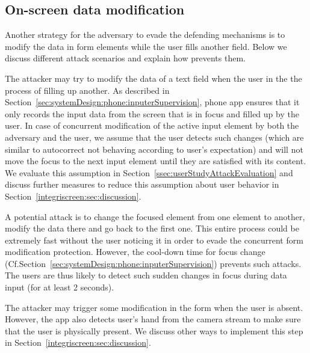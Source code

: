 \subsection{On-screen data modification}
Another strategy for the adversary to evade the defending mechanisms is to modify the data in form elements while the user fills another field. Below we discuss different attack scenarios and explain how \sysname prevents them.


 The attacker may try to modify the data of a text field when the user in the the process of filling up another. As described in Section~\ref{sec:systemDesign:phone:inputerSupervision}, \sysname phone app ensures that it only records the input data from the screen that is in focus and filled up by the user. In case of concurrent modification of the active input element by both the adversary and the user, we assume that the user detects such changes (which are similar to autocorrect not behaving according to user's expectation) and will not move the focus to the next input element until they are satisfied with its content.
We evaluate this assumption in Section~\ref{ssec:userStudyAttackEvaluation} and discuss further measures to reduce this assumption about user behavior in Section~\ref{integriscreen:sec:discussion}.


 A potential attack is to change the focused element from one element to another, modify the data there and go back to the first one. This entire process could be extremely fast without the user noticing it in order to evade the concurrent form modification protection. However, the cool-down time for focus change (Cf.Section~\ref{sec:systemDesign:phone:inputerSupervision}) prevents such attacks. The users are thus likely to detect such sudden changes in focus during data input (for at least 2 seconds).

 The attacker may trigger some modification in the form when the user is absent. However, the \sysname app also detects user's hand from the camera stream to make sure that the user is physically present. We discuss other ways to implement this step in Section~\ref{integriscreen:sec:discussion}.
